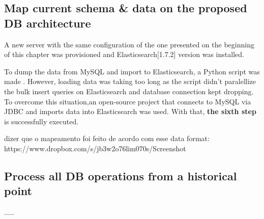 \clearpage
\subsection{Map current schema \& data on the proposed DB architecture}

A new server with the same configuration of the one presented on the beginning of this chapter was provisioned and Elasticsearch[1.7.2] version was installed.

To dump the data from MySQL and import to Elasticsearch, a Python script was made \cite{mysqltoes}. However, loading data was taking too long as the script didn't paralellize the bulk insert queries on Elasticsearch and database connection kept dropping. To overcome this situation,an open-source project that connects to MySQL via JDBC and imports data into Elasticsearch \cite{elasticjdbc} was used. 
With that, \textbf{the sixth step} is successfully executed. 

dizer que o mapeamento foi feito de acordo com esse data format: https://www.dropbox.com/s/jb3w2o76lim070s/Screenshot%





















\clearpage
\subsection{Process all DB operations from a historical point}



.....







